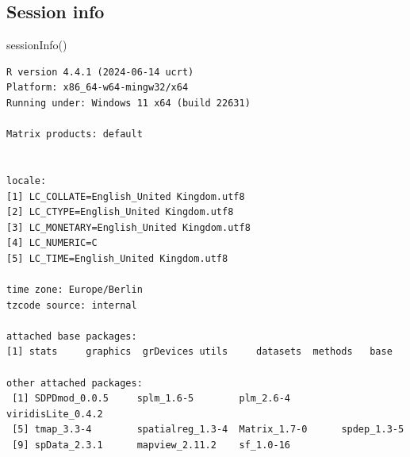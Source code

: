 \documentclass[
  letterpaper,
]{scrbook}
\newenvironment{Shaded}{\begin{snugshade}}{\end{snugshade}}
\newcommand{\FunctionTok}[1]{\textcolor[rgb]{0.28,0.35,0.67}{#1}}
\newcommand{\NormalTok}[1]{\textcolor[rgb]{0.00,0.23,0.31}{#1}}
\begin{document}
\hypertarget{session-info-11}{%
\subsection*{Session info}\label{session-info-11}}

\begin{Shaded}
\begin{Highlighting}[]
\FunctionTok{sessionInfo}\NormalTok{()}
\end{Highlighting}
\end{Shaded}

\begin{verbatim}
R version 4.4.1 (2024-06-14 ucrt)
Platform: x86_64-w64-mingw32/x64
Running under: Windows 11 x64 (build 22631)

Matrix products: default


locale:
[1] LC_COLLATE=English_United Kingdom.utf8 
[2] LC_CTYPE=English_United Kingdom.utf8   
[3] LC_MONETARY=English_United Kingdom.utf8
[4] LC_NUMERIC=C                           
[5] LC_TIME=English_United Kingdom.utf8    

time zone: Europe/Berlin
tzcode source: internal

attached base packages:
[1] stats     graphics  grDevices utils     datasets  methods   base     

other attached packages:
 [1] SDPDmod_0.0.5     splm_1.6-5        plm_2.6-4         viridisLite_0.4.2
 [5] tmap_3.3-4        spatialreg_1.3-4  Matrix_1.7-0      spdep_1.3-5      
 [9] spData_2.3.1      mapview_2.11.2    sf_1.0-16        


\end{verbatim}
\end{document}
